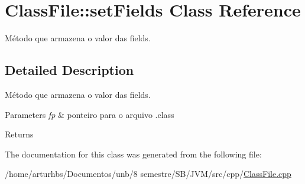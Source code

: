 \hypertarget{classClassFile_1_1setFields}{}\section{Class\+File\+:\+:set\+Fields Class Reference}
\label{classClassFile_1_1setFields}


Método que armazena o valor das fields.  




\subsection{Detailed Description}
Método que armazena o valor das fields. 


\begin{DoxyParams}{Parameters}
{\em fp} & ponteiro para o arquivo .class \\
\hline
\end{DoxyParams}
\begin{DoxyReturn}{Returns}

\end{DoxyReturn}


The documentation for this class was generated from the following file\+:\begin{DoxyCompactItemize}
\item 
/home/arturhbs/\+Documentos/unb/8 semestre/\+S\+B/\+J\+V\+M/src/cpp/\hyperlink{ClassFile_8cpp}{Class\+File.\+cpp}\end{DoxyCompactItemize}
